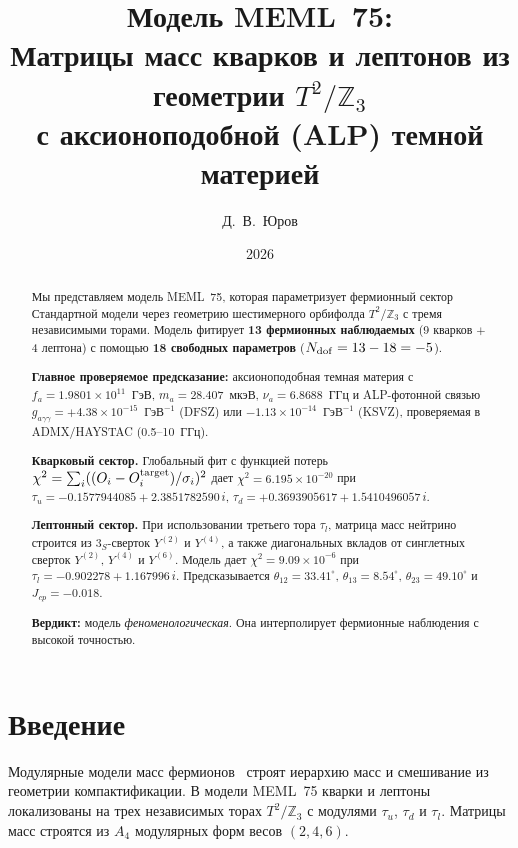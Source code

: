 \documentclass[12pt,a4paper]{article}
\title{\textbf{Модель MEML~75:}\\[0.3cm]
\large Матрицы масс кварков и лептонов из геометрии $T^2/\mathbb{Z}_3$\\
с аксионоподобной (ALP) темной материей}
\author{Д.~В.~Юров}
\date{2026}
\numberwithin{equation}{section}
\begin{document}
\maketitle

\begin{abstract}
\noindent
Мы представляем модель MEML~75, которая параметризует фермионный сектор 
Стандартной модели через геометрию шестимерного орбифолда $T^2/\mathbb{Z}_3$ 
с тремя независимыми торами. Модель фитирует \textbf{13 фермионных наблюдаемых} 
(9 кварков $+$ 4 лептона) с помощью \textbf{18 свободных параметров} 
($N_{\rm dof} = 13-18 = -5$).

\textbf{Главное проверяемое предсказание:}
аксионоподобная темная материя с
$f_a = 1.9801\times10^{11}$~ГэВ,
$m_a = 28.407$~мкэВ, $\nu_a = 6.8688$~ГГц и ALP-фотонной связью
$g_{a\gamma\gamma} = +4.38\times10^{-15}$~ГэВ$^{-1}$ (DFSZ)
или $-1.13\times10^{-14}$~ГэВ$^{-1}$ (KSVZ), проверяемая
в ADMX/HAYSTAC (0.5--10~ГГц).

\textbf{Кварковый сектор.} Глобальный фит с функцией потерь
$\chi^2 = \sum_i ((O_i-O_i^{\rm target})/\sigma_i)^2$ дает
$\chi^2 = 6.195\times10^{-20}$ при
$\tau_u = -0.1577944085 + 2.3851782590\,i$,
$\tau_d = +0.3693905617 + 1.5410496057\,i$.

\textbf{Лептонный сектор.} При использовании третьего тора \(\tau_l\), матрица масс нейтрино строится из \(3_S\)-сверток $Y^{(2)}$ и $Y^{(4)}$, а также диагональных вкладов от синглетных сверток $Y^{(2)}$, $Y^{(4)}$ и $Y^{(6)}$. Модель дает
$\chi^2 = 9.09\times10^{-6}$ при $\tau_l = -0.902278 + 1.167996\,i$. Предсказывается
$\theta_{12}=33.41^\circ$, $\theta_{13}=8.54^\circ$, $\theta_{23}=49.10^\circ$ и $J_{cp}=-0.018$.

\textbf{Вердикт:} модель \emph{феноменологическая}. Она интерполирует фермионные наблюдения с высокой точностью.
\end{abstract}

\newpage

\section{Введение}

Модулярные модели масс фермионов~\cite{Feruglio2017,Kobayashi2019}
строят иерархию масс и смешивание из геометрии компактификации.
В модели MEML~75 кварки и лептоны локализованы на трех
независимых торах $T^2/\mathbb{Z}_3$ с модулями $\tau_u$, $\tau_d$ и \(\tau_l\). Матрицы масс строятся из $A_4$ модулярных форм весов $(2,4,6)$.
\end{document}
